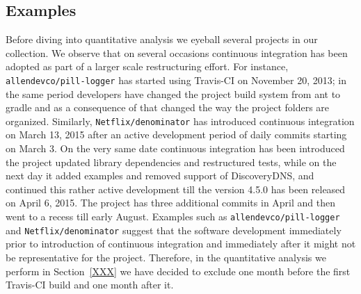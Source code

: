 \subsection{Examples}
\label{sec:examples}
Before diving into quantitative analysis we eyeball several projects in our collection. 
We observe that on several occasions continuous integration has been adopted as
part of a larger scale restructuring effort. 
For instance, \texttt{allendevco/pill-logger} has started using Travis-CI on November 20,
2013; in the same period developers have changed the project build system from ant to
gradle and as a consequence of that changed the way the project folders are organized.
Similarly, \texttt{Netflix/denominator} has introduced continuous integration on March 13, 2015
after an active development period of daily commits starting on March 3.
On the very same date continuous integration has been introduced 
the project updated library dependencies and restructured tests, while
on the next day it added examples and removed support of DiscoveryDNS, and continued
this rather active development till the version 4.5.0 has been released on April 6, 2015.
The project has three additional commits in April and then went to a recess till early August. 
Examples such as \texttt{allendevco/pill-logger} and \texttt{Netflix/denominator} 
suggest that the software development immediately prior to introduction of continuous 
integration and immediately after it might not be representative for the project.
Therefore, in the quantitative analysis we perform in Section~\ref{XXX} we have decided to
exclude one month before the first Travis-CI build and one month after it.